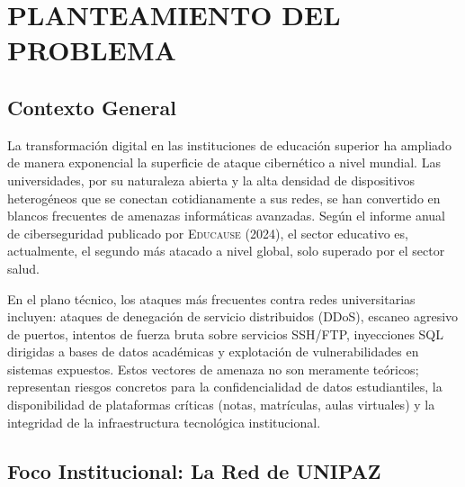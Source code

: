 \documentclass[12pt, letterpaper, oneside]{report}
\begin{document}
\setcounter{page}{3}
\tableofcontents
\clearpage
\listoffigures
\clearpage
\listoftables
\clearpage

\setcounter{page}{1}

\chapter{PLANTEAMIENTO DEL PROBLEMA}

\section{Contexto General}

La transformación digital en las instituciones de educación superior ha ampliado de manera exponencial la superficie de ataque cibernético a nivel mundial. Las universidades, por su naturaleza abierta y la alta densidad de dispositivos heterogéneos que se conectan cotidianamente a sus redes, se han convertido en blancos frecuentes de amenazas informáticas avanzadas. Según el informe anual de ciberseguridad publicado por \textsc{Educause} (2024), el sector educativo es, actualmente, el segundo más atacado a nivel global, solo superado por el sector salud.

En el plano técnico, los ataques más frecuentes contra redes universitarias incluyen: ataques de denegación de servicio distribuidos (DDoS), escaneo agresivo de puertos, intentos de fuerza bruta sobre servicios SSH/FTP, inyecciones SQL dirigidas a bases de datos académicas y explotación de vulnerabilidades en sistemas expuestos. Estos vectores de amenaza no son meramente teóricos; representan riesgos concretos para la confidencialidad de datos estudiantiles, la disponibilidad de plataformas críticas (notas, matrículas, aulas virtuales) y la integridad de la infraestructura tecnológica institucional.

\section{Foco Institucional: La Red de UNIPAZ}
\end{document}
